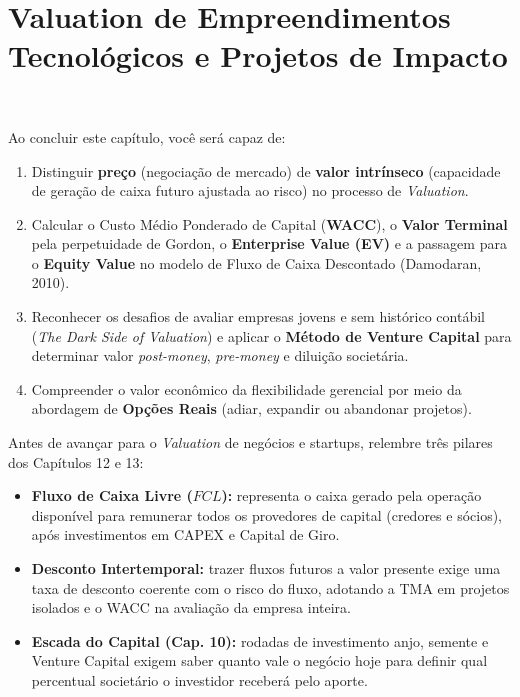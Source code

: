 \chapter{Valuation de Empreendimentos Tecnológicos e Projetos de Impacto}
\label{cap:14}

\noindent{}\ \tagQuant
\vspace{6pt}

\begin{capObjetivos}
Ao concluir este capítulo, você será capaz de:
\begin{enumerate}[leftmargin=1.4em, itemsep=2pt]
  \item Distinguir \textbf{preço} (negociação de mercado) de \textbf{valor intrínseco} (capacidade de geração de caixa futuro ajustada ao risco) no processo de \textit{Valuation}.
  \item Calcular o Custo Médio Ponderado de Capital (\textbf{WACC}), o \textbf{Valor Terminal} pela perpetuidade de Gordon, o \textbf{Enterprise Value (EV)} e a passagem para o \textbf{Equity Value} no modelo de Fluxo de Caixa Descontado (Damodaran, 2010).
  \item Reconhecer os desafios de avaliar empresas jovens e sem histórico contábil (\textit{The Dark Side of Valuation}) e aplicar o \textbf{Método de Venture Capital} para determinar valor \textit{post-money}, \textit{pre-money} e diluição societária.
  \item Compreender o valor econômico da flexibilidade gerencial por meio da abordagem de \textbf{Opções Reais} (adiar, expandir ou abandonar projetos).
\end{enumerate}
\end{capObjetivos}

\begin{capRevisao}
Antes de avançar para o \textit{Valuation} de negócios e startups, relembre três pilares dos Capítulos 12 e 13:
\begin{itemize}[leftmargin=1.4em, itemsep=2pt]
  \item \textbf{Fluxo de Caixa Livre ($FCL$):} representa o caixa gerado pela operação disponível para remunerar todos os provedores de capital (credores e sócios), após investimentos em CAPEX e Capital de Giro.
  \item \textbf{Desconto Intertemporal:} trazer fluxos futuros a valor presente exige uma taxa de desconto coerente com o risco do fluxo, adotando a TMA em projetos isolados e o WACC na avaliação da empresa inteira.
  \item \textbf{Escada do Capital (Cap. 10):} rodadas de investimento anjo, semente e Venture Capital exigem saber quanto vale o negócio hoje para definir qual percentual societário o investidor receberá pelo aporte.
\end{itemize}
\end{capRevisao}

